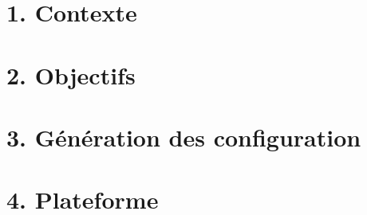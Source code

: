 \documentclass{beamer}
\begin{document}
\setlength{\TPHorizModule}{1cm}
\setlength{\TPVertModule}{1cm}


\makeposter

\begin{firstcolumn}
	\section{1. Contexte}
	\lipsum[1]
		
		
	\section{2. Objectifs}
	\lipsum[2-4]
\end{firstcolumn}
\begin{secondcolumn}
	\section{3. Génération des configuration}
	\lipsum[5-7]
	
	
	\section{4. Plateforme}
	\lipsum[8-9]
\end{secondcolumn}
\end{document}
